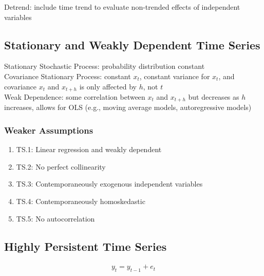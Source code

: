 \documentclass[12pt]{article}
\numberwithin{equation}{section}
\begin{document}
Detrend: include time trend to evaluate non-trended effects of independent variables

\subsection{Stationary and Weakly Dependent Time Series}

Stationary Stochastic Process: probability distribution constant \\[0.5cm]
Covariance Stationary Process: constant $x_t$, constant variance for $x_t$, and covariance $x_t$ and $x_{t+h}$ is only affected by $h$, not $t$ \\[0.5cm]
Weak Dependence: some correlation between $x_t$ and $x_{t+h}$ but decreases as $h$ increases, allows for OLS (e.g., moving average models, autoregressive models)

\subsubsection{Weaker Assumptions}
\begin{enumerate}
    \item TS.1: Linear regression and weakly dependent
    \item TS.2: No perfect collinearity
    \item TS.3: Contemporaneously exogenous independent variables
    \item TS.4: Contemporaneously homoskedastic
    \item TS.5: No autocorrelation
\end{enumerate}

\subsection{Highly Persistent Time Series}

\begin{gather}
    y_t = y_{t-1} + e_t
\end{gather}
\end{document}
